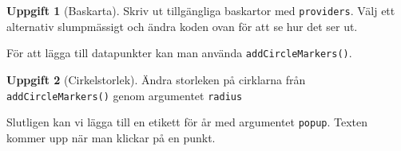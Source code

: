 \documentclass[
]{book}
\newenvironment{Shaded}{\begin{snugshade}}{\end{snugshade}}
\newcommand{\AttributeTok}[1]{\textcolor[rgb]{0.77,0.63,0.00}{#1}}
\newcommand{\DecValTok}[1]{\textcolor[rgb]{0.00,0.00,0.81}{#1}}
\newcommand{\FunctionTok}[1]{\textcolor[rgb]{0.00,0.00,0.00}{#1}}
\newcommand{\NormalTok}[1]{#1}
\newcommand{\SpecialCharTok}[1]{\textcolor[rgb]{0.00,0.00,0.00}{#1}}
\theoremstyle{definition}
\theoremstyle{definition}
\theoremstyle{definition}
\newtheorem{exercise}{Uppgift}[chapter]
\theoremstyle{definition}
\theoremstyle{remark}
\begin{document}
\begin{Shaded}
\end{Shaded}

\begin{exercise}[Baskarta]
Skriv ut tillgängliga baskartor med \texttt{providers}. Välj ett alternativ slumpmässigt och ändra koden ovan för att se hur det ser ut.
\end{exercise}

För att lägga till datapunkter kan man använda \texttt{addCircleMarkers()}.

\begin{Shaded}
\end{Shaded}

\begin{exercise}[Cirkelstorlek]
Ändra storleken på cirklarna från \texttt{addCircleMarkers()} genom argumentet \texttt{radius}
\end{exercise}

Slutligen kan vi lägga till en etikett för år med argumentet \texttt{popup}. Texten kommer upp när man klickar på en punkt.

\begin{Shaded}
\end{Shaded}
\end{document}
